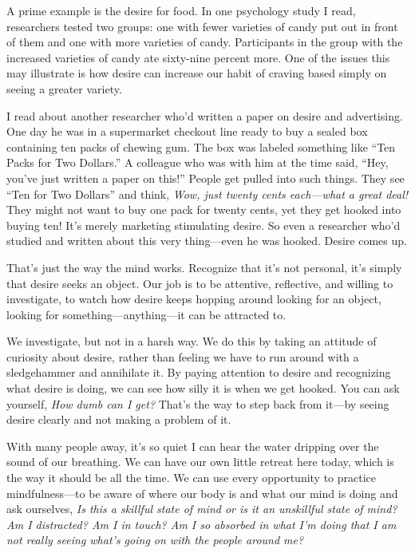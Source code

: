 A prime example is the desire for food. In one psychology study I read, 
researchers tested two groups: one with fewer varieties of candy put 
out in front of them and one with more varieties of candy. Participants 
in the group with the increased varieties of candy ate sixty-nine 
percent more. One of the issues this may illustrate is how desire can 
increase our habit of craving based simply on seeing a greater variety.

I read about another researcher who'd written a paper on desire and
advertising. One day he was in a supermarket checkout line ready to buy
a sealed box containing ten packs of \mbox{chewing} gum. The box was
labeled something like ``Ten Packs for Two Dollars.'' A colleague who
was with him at the time said, ``Hey, you've just written a paper on
this!'' People get pulled into such things. They see ``Ten for Two
Dollars'' and think, \emph{Wow, just twenty cents each---what a great
deal!} They might not want to buy one pack for twenty cents, yet they
get hooked into buying ten! It's merely marketing stimulating desire. So
even a researcher who'd studied and written about this very thing---even
he was hooked. Desire comes up.

That's just the way the mind works. Recognize that it's not personal, 
it's simply that desire seeks an object. Our job is to be attentive, 
reflective, and willing to investigate, to watch how desire keeps 
hopping around looking for an object, looking for 
something---anything---it can be attracted to.

We investigate, but not in a harsh way. We do this by taking an 
attitude of curiosity about desire, rather than feeling we have to run 
around with a sledgehammer and annihilate it. By paying attention to 
desire and recognizing what desire is doing, we can see how silly it is 
when we get hooked. You can ask yourself, \emph{How dumb can I get?} 
That's the way to step back from it---by seeing desire clearly and not 
making a problem of it.


With many people away, it's so quiet I can hear the water dripping over 
the sound of our breathing. We can have our own little retreat here 
today, which is the way it should be all the time. We can use every 
opportunity to practice mindfulness---to be aware of where our body is 
and what our mind is doing and ask ourselves, \emph{Is this a skillful 
state of mind or is it an unskillful state of mind? Am I distracted? Am 
I in touch? Am I so absorbed in what I'm doing that I am not really 
seeing what's going on with the people around me?}

